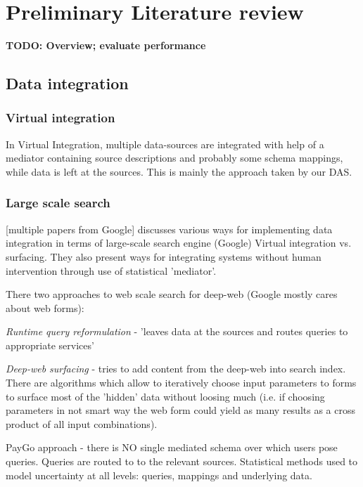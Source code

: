 \documentclass[a4paper,11pt,draft]{article}
\begin{document}
\section{Preliminary Literature review}


\textbf{\color{red}TODO: Overview; evaluate performance}

\subsection{Data integration}
\subsubsection*{Virtual integration}
In Virtual Integration, multiple data-sources are integrated with help of a mediator containing source descriptions and probably some schema mappings, while data is left at the sources. This is mainly the approach taken by our DAS.


\subsubsection*{Large scale search}
[multiple papers from Google] discusses various ways for implementing data integration in terms of large-scale search engine (Google) Virtual integration vs. surfacing. They also present ways for integrating systems without human intervention through use of statistical 'mediator'.

There two approaches to web scale search for deep-web (Google mostly cares about web forms):

\textit{Runtime query reformulation} - 'leaves data at the sources and routes queries to appropriate services'\cite[p. 1]{paygo_integration} 

\textit{Deep-web surfacing} - tries to add content from the deep-web into search index. There are algorithms which allow to iteratively choose input parameters to forms to surface most of the 'hidden' data without loosing much (i.e. if choosing parameters in not smart way the web form could yield as many results as a cross product of all input combinations).

PayGo approach - there is NO single mediated schema over which users pose queries. Queries are routed to to the relevant sources. Statistical methods used to model uncertainty at all levels: queries, mappings and underlying data.
\end{document}
